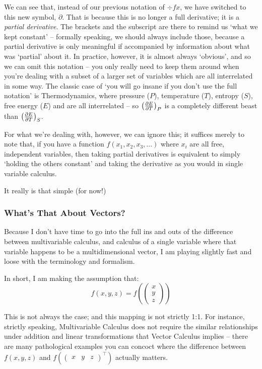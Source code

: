 \documentclass[a4paper,openany,11pt]{book}
\begin{document}
			We can see that, instead of our previous notation of $\div{f}{x}$, we have switched to this new symbol, $\partial$. That is because this is no longer a full derivative; it is a \textit{partial derivative}. The brackets and the subscript are there to remind us `what we kept constant' -- formally speaking, we should always include those, because a partial derivative is only meaningful if accompanied by information about what was `partial' about it. In practice, however, it is almost always `obvious', and so we can omit this notation -- you only really need to keep them around when you're dealing with a subset of a larger set of variables which are all interrelated in some way. The classic case of `you will go insane if you don't use the full notation' is Thermodynamics, where pressure ($P$), temperature ($T$), entropy ($S$), free energy ($E$) and are all interrelated -- so $\left(\frac{\partial E}{\partial T} \right)_P$ is a completely different beast than $\left(\frac{\partial E}{\partial T}\right)_S$. 

			For what we're dealing with, however, we can ignore this; it suffices merely to note that, if you have a function $f(x_1,x_2,x_3,...)$ where $x_i$ are all free, independent variables, then taking partial derivatives is equivalent to simply `holding the others constant' and taking the derivative as you would in single variable calculus. 

			It really is that simple (for now!)
	
	
			\subsubsection{What's That About Vectors?}
	
				Because I don't have time to go into the full ins and outs of the difference between multivariable calculus, and calculus of a single variable where that variable happens to be a multidimensional vector, I am playing slightly fast and loose with the terminology and formalism. 
	
				In short, I am making the assumption that:
				$$f(x,y,z) = f\left( \begin{pmatrix} x \\ y \\ z \end{pmatrix} \right)$$
	
				This is not always the case; and this mapping is not strictly 1:1. For instance, strictly speaking, Multivariable Calculus does not require the similar relationships under addition and linear transformations that Vector Calculus implies -- there are many pathological examples you can concoct where the difference between $f(x,y,z)$ and $f\left( \begin{pmatrix} x & y & z \end{pmatrix}^\intercal \right)$ actually matters. 
	
\end{document}
